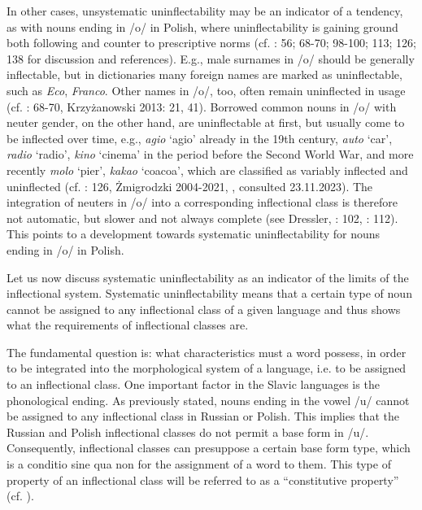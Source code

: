 \documentclass[output=paper]{langscibook}
\begin{document}
In other cases, unsystematic uninflectability may be an indicator of a tendency, as with nouns ending in /o/ in Polish, where uninflectability is gaining ground both following and counter to prescriptive norms (cf. \citealt{Doleschal2000}: 56; 68-70; 98-100; 113; 126; 138 for discussion and references). E.g., male surnames in /o/ should be generally inflectable, but in dictionaries many foreign names are marked as uninflectable, such as \textit{Eco}, \textit{Franco}. Other names in /o/, too, often remain uninflected in usage (cf. \citealt{Doleschal2000}: 68-70, Krzyżanowski 2013: 21, 41). Borrowed common nouns in /o/ with neuter gender, on the other hand, are uninflectable at first, but usually come to be inflected over time, e.g., \textit{agio} ‘agio’ already in the 19th century, \textit{auto} ‘car’, \textit{radio} ‘radio’, \textit{kino} ‘cinema’ in the period before the Second World War, and more recently \textit{molo} ‘pier’, \textit{kakao} ‘coacoa’, which are classified as variably inflected and uninflected (cf. \citealt{Doleschal2000}: 126, Żmigrodzki 2004-2021, \citealt{Woliński2020}, consulted 23.11.2023). The integration of neuters in /o/ into a corresponding inflectional class is therefore not automatic, but slower and not always complete (see Dressler, \citealt{Dziubalska-KołaczykFabiszak1997}: 102, \citealt{Orzechowska1974}: 112). This points to a development towards systematic uninflectability for nouns ending in /o/ in Polish.

Let us now discuss systematic uninflectability as an indicator of the limits of the inflectional system. Systematic uninflectability means that a certain type of noun cannot be assigned to any inflectional class of a given language and thus shows what the requirements of inflectional classes are.

The fundamental question is: what characteristics must a word possess, in order to be integrated into the morphological system of a language, i.e. to be assigned to an inflectional class. One important factor in the Slavic languages is the phonological ending. As previously stated, nouns ending in the vowel /u/ cannot be assigned to any inflectional class in Russian or Polish. This implies that the Russian and Polish inflectional classes do not permit a base form in /u/. Consequently, inflectional classes can presuppose a certain base form type, which is a conditio sine qua non for the assignment of a word to them. This type of property of an inflectional class will be referred to as a “constitutive property” (cf. \citealt{Doleschal1997,Doleschal2006}). 
\end{document}
